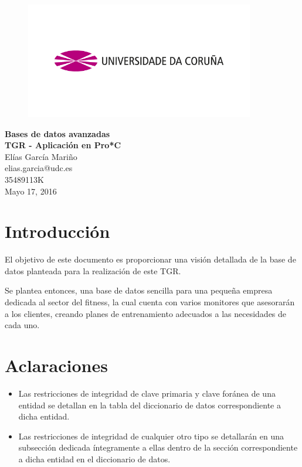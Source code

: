 \documentclass[12pt, a4paper]{article}
\begin{document}
	\newpage
	
	\begin{titlepage} %

		\begin{figure}[h]
			\centering
			\includegraphics[width=10cm]{Imagenes/logo-udc}
		\end{figure}
	
		\begin{center}
			\LARGE{\textbf{Bases de datos avanzadas}}
			\\[0.5cm]
			
			\Large{\textbf{TGR - Aplicación en Pro*C}}
			\\[2cm]
			
			\Large Elías García Mariño
			\\[0.5cm]
			\Large elias.garcia@udc.es
			\\[0.5cm]
			\Large 35489113K
			\\[2cm]
			
			\Large Mayo 17, 2016
		\end{center}
	
	\end{titlepage}
	
	\newpage
	\tableofcontents
	
	\newpage
	\section{Introducción}
	El objetivo de este documento es proporcionar una visión detallada de la base de datos planteada para la realización de este TGR. \\\par
	Se plantea entonces, una base de datos sencilla para una pequeña empresa dedicada al sector del fitness, la cual cuenta con varios monitores que asesorarán a los clientes, creando planes de entrenamiento adecuados a las necesidades de cada uno.
	
	\section{Aclaraciones}
	\begin{itemize}
		\item Las restricciones de integridad de clave primaria y clave foránea de una entidad se detallan en la tabla del diccionario de datos correspondiente a dicha entidad.
		\item Las restricciones de integridad de cualquier otro tipo se detallarán en una subsección dedicada íntegramente a ellas dentro de la sección correspondiente a dicha entidad en el diccionario de datos. 
	\end{itemize}
\end{document}
